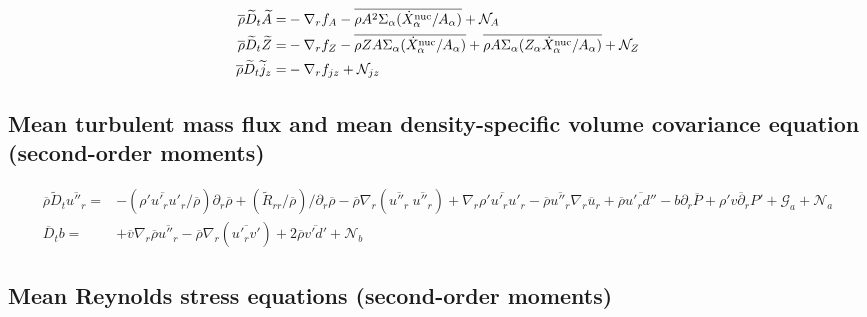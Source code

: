 \documentclass[10pt,paper=a4]{report}
\newcommand{\eht}{\overline}
\newcommand{\fht}{\widetilde}
\newcommand{\fav}{\widetilde}
\newcommand{\av}{\overline}
\def\erho{\eht{\rho}}
\begin{document}
\begin{table}[!h]
\begin{align}
\erho\fav{D}_t \fav{A} = & -\nabla_r f_A - \av{\rho A^2\Sigma_\alpha (\dot{X}_\alpha^{\rm nuc} / A_\alpha)} + {\mathcal N_A}  \label{eq:rans_abar}\\
\erho\fav{D}_t \fav{Z} = & -\nabla_r f_Z  - \av{\rho Z A \Sigma_\alpha (\dot{X}_\alpha^{\rm nuc} / A_\alpha)}  + \overline{\rho A \Sigma_\alpha (Z_\alpha \dot{X}_\alpha^{\rm nuc} / A_\alpha)} + {\mathcal N_Z} \label{eq:rans_zbar} \\
\erho\fav{D}_t \fav{j}_z = & -\nabla_r f_{jz}  + {\mathcal N_{jz}} \label{eq:rans_jz} 
\end{align}
\end{table}


\subsection{Mean turbulent mass flux and mean density-specific volume covariance equation (second-order moments)}

\begin{table}[!h]
\label{tab:rans}
\begin{align}
\eht{\rho}\fht{D}_t \eht{u''_r} =&  -(\eht{\rho'u'_ru'_r}/\eht{\rho})\partial_r\eht{\rho} + (\fht{R}_{rr}/\eht{\rho})/\partial_r \eht{\rho} - \eht{\rho} \nabla_r (\eht{u''_r} \ \eht{u''_r}) + \nabla_r \overline{\rho' u'_r u'_r} - \eht{\rho}\eht{u''_r} \nabla_r \eht{u}_r + \eht{\rho} \eht{u'_r d''} - b\partial_r \eht{P} + \eht{\rho' v \partial_r P'} +{\mathcal G_a} + {\mathcal N_a} \label{eq:rans_a}\\
\eht{D}_t b = &  +\eht{v} \nabla_r \eht{\rho} \eht{u''_r} -\eht{\rho}\nabla_r (\eht{u'_r v'}) + 2\eht{\rho}\eht{v'd'} +  {\mathcal N_b} \label{eq:rans_b}
\end{align}
\end{table}


\newpage

\subsection{Mean Reynolds stress equations (second-order moments)}
\end{document}

